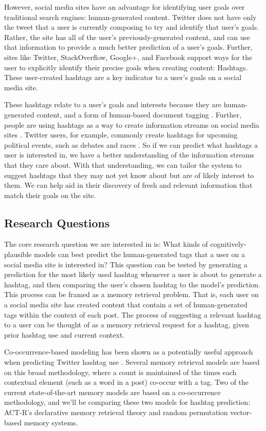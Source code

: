 \documentclass[man,floatsintext]{apa6}
\begin{document}
However, social media sites have an advantage for identifying user goals over traditional search engines:
human-generated content.
Twitter does not have only the tweet that a user is currently composing to try and identify that user's goals.
Rather, the site has all of the user's previously-generated content, and can use that information to provide a much better prediction of a user's goals.
Further, sites like Twitter, StackOverflow, Google+, and Facebook support ways for the user to explicitly identify their precise goals when creating content: Hashtags.
These user-created hashtags are a key indicator to a user's goals on a social media site. 

These hashtags relate to a user's goals and interests because they are human-generated content, and a form of human-based document tagging \parencite{Chang2010}.
Further, people are using hashtags as a way to create information streams on social media sites \parencite{Kwak2010}.
Twitter users, for example, commonly create hashtags for upcoming political events, such as debates and races \parencite{Diakopoulos2010}.
So if we can predict what hashtags a user is interested in, we have a better understanding of the information streams that they care about.
With that understanding, we can tailor the system to suggest hashtags that they may not yet know about but are of likely interest to them.
We can help aid in their discovery of fresh and relevant information that match their goals on the site.

\subsection{Research Questions}

The core research question we are interested in is:
What kinds of cognitively-plausible models can best predict the human-generated tags that a user on a social media site is interested in?
This question can be tested by generating a prediction for the most likely used hashtag whenever a user is about to generate a hashtag, and then comparing the user's chosen hashtag to the model's prediction.
This process can be framed as a memory retrieval problem.
That is, each user on a social media site has created content that contain a set of human-generated tags within the context of each post.
The process of suggesting a relevant hashtag to a user can be thought of as a memory retrieval request for a hashtag, given prior hashtag use and current context.

Co-occurrence-based modeling has been shown as a potentially useful approach when predicting Twitter hashtag use \parencite{Efron2010}.
Several memory retrieval models are based on this broad methodology, where a count is maintained of the times each contextual element (such as a word in a post) co-occur with a tag.
Two of the current state-of-the-art memory models are based on a co-occurrence methodology, and we'll be comparing these two models for hashtag prediction:
ACT-R's declarative memory retrieval theory and random permutation vector-based memory systems.
\end{document}
